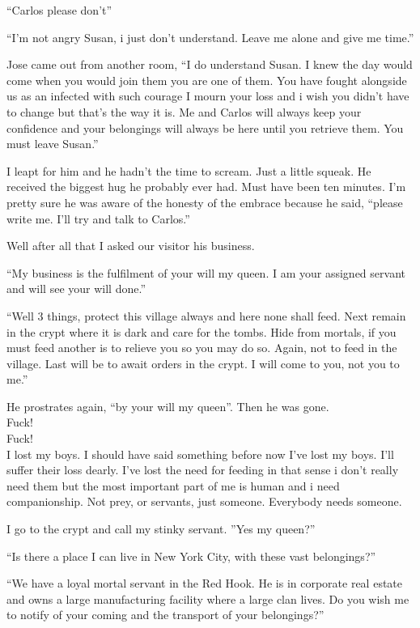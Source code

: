 ``Carlos please don't''

``I'm not angry Susan, i just don't understand. Leave me alone and give me time.''

Jose came out from another room, ``I do understand Susan. I knew the day would come when you would join them you are one of them. You have fought alongside us as an infected with such courage I mourn your loss and i wish you didn't have to change but that's the way it is. Me and Carlos will always keep your confidence and your belongings will always be here until you retrieve them. You must leave Susan.''

I leapt for him and he hadn't the time to scream. Just a little squeak. He received the biggest hug he probably ever had. Must have been ten minutes. I'm pretty sure he was aware of the honesty of the embrace because he said, ``please write me. I'll try and talk to Carlos.''

Well after all that I asked our visitor his business.

``My business is the fulfilment of your will my queen. I am your assigned servant and will see your will done.''

``Well 3 things, protect this village always and here none shall feed. Next remain in the crypt where it is dark and care for the tombs. Hide from mortals, if you must feed another is to relieve you so you may do so. Again, not to feed in the village. Last will be to await orders in the crypt. I will come to you, not you to me.''

He prostrates again, ``by your will my queen''. Then he was gone.\\

Fuck!\\

Fuck!\\

I lost my boys. I should have said something before now I've lost my boys.  I'll suffer their loss dearly. I've lost the need for feeding in that sense i don't really need them but the most important part of me is human and i need companionship. Not prey, or servants, just someone. Everybody needs someone.

I go to the crypt and call my stinky servant. ''Yes my queen?''

``Is there a place I can live in New York City, with these vast belongings?''

``We have a loyal mortal servant in the Red Hook. He is in corporate real estate and owns a large manufacturing facility where a large clan lives. Do you wish me to notify of your coming and the transport of your belongings?''

